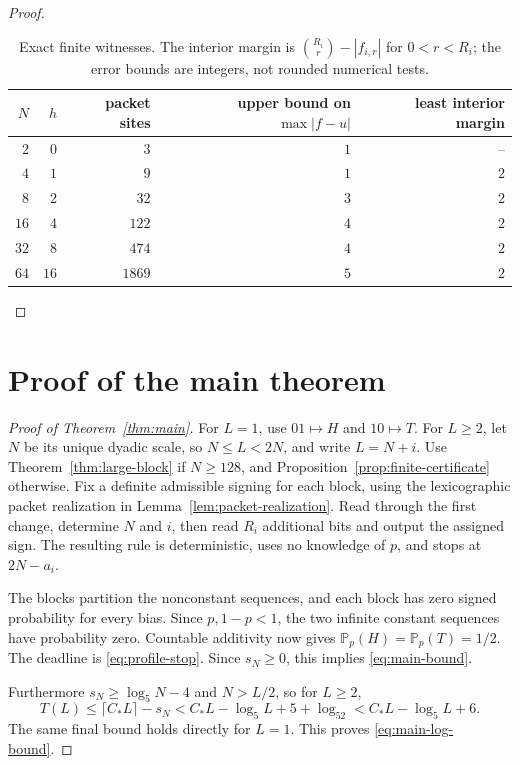 \documentclass[11pt]{article}
\theoremstyle{definition}
\theoremstyle{remark}
\newcommand{\Prb}{\mathbb P}
\begin{document}
\begin{proof}
\begin{table}[ht]
\centering
\begin{tabular}{@{}rrrrr@{}}
\toprule
$N$ & $h$ & packet sites & upper bound on $\max|f-u|$ & least interior margin\\
\midrule
$2$  & $0$  & $3$    & $1$ & --\\
$4$  & $1$  & $9$    & $1$ & $2$\\
$8$  & $2$  & $32$   & $3$ & $2$\\
$16$ & $4$  & $122$  & $4$ & $2$\\
$32$ & $8$  & $474$  & $4$ & $2$\\
$64$ & $16$ & $1869$ & $5$ & $2$\\
\bottomrule
\end{tabular}
\caption{Exact finite witnesses. The interior margin is
$\binom{R_i}{r}-|f_{i,r}|$ for $0<r<R_i$; the error bounds are integers,
not rounded numerical tests.}
\label{tab:finite}
\end{table}
\end{proof}

\section{Proof of the main theorem}

\begin{proof}[Proof of Theorem~\ref{thm:main}]
For $L=1$, use $01\mapsto H$ and $10\mapsto T$. For $L\ge2$, let $N$
be its unique dyadic scale, so $N\le L<2N$, and write $L=N+i$.
Use Theorem~\ref{thm:large-block} if $N\ge128$, and
Proposition~\ref{prop:finite-certificate} otherwise.
Fix a definite admissible signing for each block, using the
lexicographic packet realization in Lemma~\ref{lem:packet-realization}.
Read through the first change, determine $N$ and $i$, then read $R_i$
additional bits and output the assigned sign. The resulting rule is
deterministic, uses no knowledge of $p$, and stops at $2N-a_i$.

The blocks partition the nonconstant sequences, and each block has zero
signed probability for every bias. Since $p,1-p<1$, the two infinite
constant sequences have probability zero. Countable additivity now gives
$\Prb_p(H)=\Prb_p(T)=1/2$. The deadline is \eqref{eq:profile-stop}.
Since $s_N\ge0$, this implies \eqref{eq:main-bound}.

Furthermore $s_N\ge\log_5N-4$ and $N>L/2$, so for $L\ge2$,
\[
 T(L)\le\lceil C_*L\rceil-s_N
 <C_*L-\log_5L+5+\log_52
 <C_*L-\log_5L+6.
\]
The same final bound holds directly for $L=1$. This proves
\eqref{eq:main-log-bound}.
\end{proof}
\end{document}
